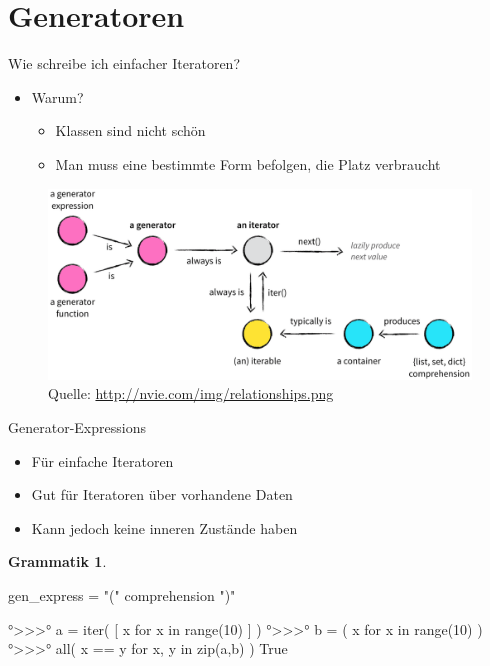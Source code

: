 \documentclass[ngerman]{beamer}
\theoremstyle{definition}
\newtheorem{grammatik}{Grammatik}
\begin{document}
\section{Generatoren}

\begin{frame}[fragile]{Wie schreibe ich einfacher Iteratoren?}
	\begin{itemize}
		\item Warum?
		\begin{itemize}
			\item {Klassen sind nicht schön}
			\item {Man muss eine bestimmte Form befolgen, die Platz verbraucht}
		\end{itemize}
	\end{itemize}
	\begin{figure}
		\includegraphics[width=0.9\linewidth]{relationships.png}\break
		{\tiny Quelle: \url{http://nvie.com/img/relationships.png}}
	\end{figure}
\end{frame}
\begin{frame}[fragile]{Generator-Expressions}
	\begin{itemize}
		\item Für einfache Iteratoren
		\item Gut für Iteratoren über vorhandene Daten
		\item Kann jedoch keine inneren Zustände haben 
	\end{itemize}
	\begin{grammatik}
		\begin{python}[numbers=none]
	gen_express = "(" comprehension ")"
		\end{python}
		\end{grammatik}
	\begin{example}
		\begin{python}[numbers=none]
°>>>° a = iter( [ x for x in range(10) ] )
°>>>° b = ( x  for x in range(10) )
°>>>° all( x == y for x, y in zip(a,b) )
True
		\end{python}
	\end{example}

\end{frame}
\end{document}
